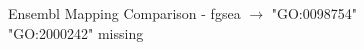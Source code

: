 \documentclass[12pt]{article}
\begin{document}
\begin{figure}[htpb]
\begin{minipage}{0.49\textwidth}
        \caption{Ensembl Mapping Comparison - fgsea $\to$ "GO:0098754" "GO:2000242" missing}
        \label{fig:ens-mapping-fgsea}
    \end{minipage}
\end{figure}





\printbibliography
\end{document}
